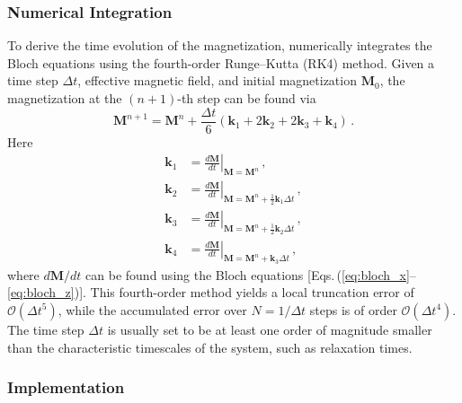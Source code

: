 \documentclass[%
 reprint,
nofootinbib,
 amsmath,amssymb,
 aps,
]{revtex4-2}
\begin{document}
\subsubsection{Numerical Integration}
\label{sec:numericalintegration}

To derive the time evolution of the magnetization, \axionbloch{} numerically integrates the Bloch equations using the fourth-order Runge--Kutta (RK4) method. 
Given a time step $\Delta t$, effective magnetic field, and initial magnetization $\mathbf{M}_0$, the magnetization at the $(n+1)$-th step can be found via
\begin{equation}
\mathbf{M}^{n+1}
=
\mathbf{M}^n
+
\frac{\Delta t}{6}
\left(
\mathbf{k}_1 + 2\mathbf{k}_2 + 2\mathbf{k}_3 + \mathbf{k}_4
\right)\,.
\end{equation}
Here 
\begin{align}
\mathbf{k}_1 &= \left.\frac{d\mathbf{M}}{dt}\right|_{\mathbf{M}=\mathbf{M}^n}\,, \\
\mathbf{k}_2 &= \left.\frac{d\mathbf{M}}{dt}\right|_{\mathbf{M}=\mathbf{M}^n + \frac{1}{2}\mathbf{k}_1\Delta t}\,, \\
\mathbf{k}_3 &= \left.\frac{d\mathbf{M}}{dt}\right|_{\mathbf{M}=\mathbf{M}^n + \frac{1}{2}\mathbf{k}_2\Delta t}\,, \\
\mathbf{k}_4 &= \left.\frac{d\mathbf{M}}{dt}\right|_{\mathbf{M}=\mathbf{M}^n + \mathbf{k}_3\Delta t}\,,
\end{align}
where $d\mathbf{M}/dt$ can be found using the Bloch equations [Eqs.\,(\ref{eq:bloch_x}--\ref{eq:bloch_z})]. 
This fourth-order method yields a local truncation error of $\mathcal{O}(\Delta t^5)$, while the accumulated error over $N = 1/\Delta t$ steps is of order $\mathcal{O}(\Delta t^4)$. 
The time step $\Delta t$ is usually set to be at least one order of magnitude smaller than the characteristic timescales of the system, such as relaxation times. 

\subsubsection{Implementation}
\label{sec:implementation}
\end{document}

